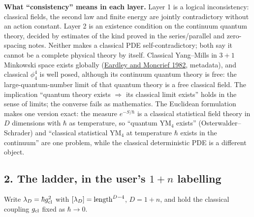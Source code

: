 \documentclass[11pt,a4paper]{article}
\begin{document}
\textbf{What ``consistency'' means in each layer.} Layer 1 is a logical
inconsistency: classical fields, the second law and finite energy are
jointly contradictory without an action constant. Layer 2 is an
existence condition on the continuum quantum theory, decided by
estimates of the kind proved in the series/parallel and zero-spacing
notes. Neither makes a classical PDE self-contradictory; both say it
cannot be a complete physical theory by itself. Classical Yang--Mills in
\(3+1\) Minkowski space exists globally
(\href{https://doi.org/10.1007/BF01976040}{Eardley and Moncrief 1982},
metadata), and classical \(\phi^4_4\) is well posed, although its
continuum quantum theory is free: the large-quantum-number limit of that
quantum theory is a free classical field. The implication ``quantum
theory exists \(\Rightarrow\) its classical limit exists'' holds in the
sense of limits; the converse fails as mathematics. The Euclidean
formulation makes one version exact: the measure \(e^{-S/\hbar}\) is a
classical statistical field theory in \(D\) dimensions with \(\hbar\) as
temperature, so ``quantum YM\(_4\) exists'' (Osterwalder--Schrader) and
``classical statistical YM\(_4\) at temperature \(\hbar\) exists in the
continuum'' are one problem, while the classical deterministic PDE is a
different object.

\hypertarget{the-ladder-in-the-users-1n-labelling}{%
\subsection{\texorpdfstring{2. The ladder, in the user's \(1+n\)
labelling}{2. The ladder, in the user's 1+n labelling}}\label{the-ladder-in-the-users-1n-labelling}}

Write \(\lambda_D=\hbar g_{\rm cl}^2\) with
\([\lambda_D]={\rm length}^{D-4}\), \(D=1+n\), and hold the classical
coupling \(g_{\rm cl}\) fixed as \(\hbar\to0\).
\end{document}

